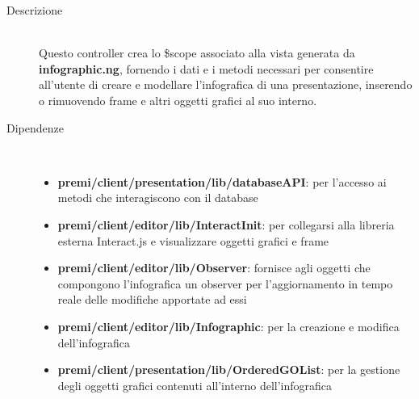 \begin{description}
\item[Descrizione] \hfill \\
	Questo controller crea lo \$scope associato alla vista generata da \textbf{infographic.ng}, fornendo i dati e i metodi necessari per consentire all'utente di creare e modellare l'infografica di una presentazione, inserendo o rimuovendo frame e altri oggetti grafici al suo interno.
	
	
	
\item[Dipendenze] \hfill \\
	\begin{itemize}
		\item \textbf{premi/client/presentation/lib/databaseAPI}: per l'accesso ai metodi che interagiscono con il database
		\item \textbf{premi/client/editor/lib/InteractInit}: per collegarsi alla libreria esterna Interact.js e visualizzare oggetti grafici e frame
		\item \textbf{premi/client/editor/lib/Observer}: fornisce agli oggetti che compongono l'infografica un observer per l'aggiornamento in tempo reale delle modifiche apportate ad essi
		\item \textbf{premi/client/editor/lib/Infographic}: per la creazione e modifica dell'infografica
	\item \textbf{premi/client/presentation/lib/OrderedGOList}: per la gestione degli oggetti grafici contenuti all'interno dell'infografica
	\end{itemize}
	

\end{description}
